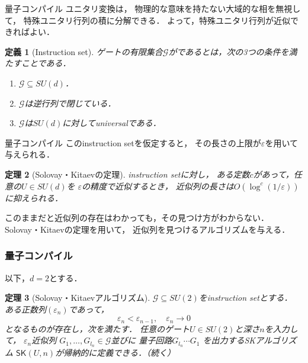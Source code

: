 \documentclass{beamer} %
\renewcommand{\epsilon}{\varepsilon}
\renewcommand{\subset}{\subseteq}
\newcommand{\set}[1]{\{\,#1\,\}}%
\newtheorem{thm}{定理}
\newtheorem{dfn}[thm]{定義}
\newtheorem{prop}[thm]{命題}
\newcommand{\0}{\mathbf{0}}
\newcommand{\1}{\mathbf{1}}
\newcommand{\2}{\mathbf{2}}
\newcommand{\SK}{\mathsf{SK}}
\begin{document}

\begin{frame}{量子コンパイル}
  ユニタリ変換は，
  物理的な意味を持たない大域的な相を無視して，
  特殊ユニタリ行列の積に分解できる．
  よって，特殊ユニタリ行列が近似できればよい．
  \begin{dfn}[Instruction set]
    ゲートの有限集合\(\mathcal{G}\)がであるとは，次の3つの条件を満たすことである．
    \begin{enumerate}
      \item \(\mathcal{G} \subset SU(d)\)．
      \item \(\mathcal{G}\)は逆行列で閉じている．
      \item \(\mathcal{G}\)は\(SU(d)\)に対してuniversalである．
    \end{enumerate}
  \end{dfn}
\end{frame}

\begin{frame}{量子コンパイル}
  このinstruction setを仮定すると，
  その長さの上限が\(\epsilon\)を用いて与えられる．
  \begin{thm}[Solovay・Kitaevの定理]
    instruction setに対し，
    ある定数\(c\)があって，任意の\(U\in SU(d)\)を
    \(\epsilon\)の精度で近似するとき，
    近似列の長さは\(O(\log^c(1/\epsilon))\)
    に抑えられる．
  \end{thm}
  このままだと近似列の存在はわかっても，その見つけ方がわからない．
  Solovay・Kitaevの定理を用いて，
  近似列を見つけるアルゴリズムを与える．
\end{frame}

\begin{frame}
  \frametitle{量子コンパイル}
  以下，\(d=2\)とする．
  \begin{thm}[Solovay・Kitaevアルゴリズム]
    \label{SK algrithm}
    \(\mathcal{G}\subset SU(2)\)をinstruction setとする．
    ある正数列\((\epsilon_n)\)であって，
    \[
      \epsilon_n < \epsilon_{n-1},\quad \epsilon_n\to 0
    \]
    となるものが存在し，次を満たす．
    任意のゲート\(U\in SU(2)\)と深さ\(n\)を入力して，
    \(\epsilon_n\)近似列
    \(G_1,\ldots,G_{l_n}\in \mathcal{G}\)並びに
    量子回路\(G_{l_n}\cdots G_1\)
    を出力するSKアルゴリズム
    \(\SK(U,n)\)が帰納的に定義できる．（続く）
  \end{thm}
\end{frame}
\end{document}
